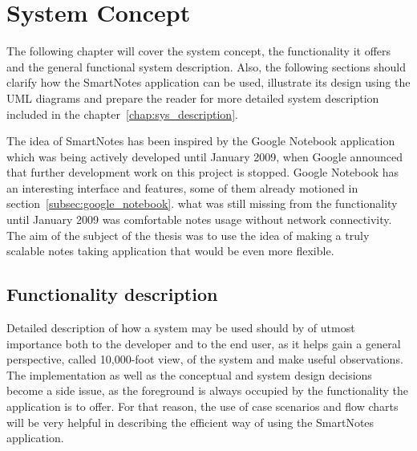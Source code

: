 \chapter{System Concept}\label{chap:concept}
The following chapter will cover the system concept, the functionality it offers and the general functional system description. Also, the following sections should clarify how the SmartNotes application can be used, illustrate its design using the UML diagrams and prepare the reader for more detailed system description included in the chapter~\ref{chap:sys_description}.

The idea of SmartNotes has been inspired by the Google Notebook application which was being actively developed until January 2009, when Google announced that further development work on this project is stopped. Google Notebook has an interesting interface and features, some of them already motioned in section~\ref{subsec:google_notebook}. what was still missing from the functionality until January 2009 was comfortable notes usage without network connectivity. The aim of the subject of the thesis was to use the idea of making a truly scalable notes taking application that would be even more flexible.

\section{Functionality description}\label{sec:functionality_descr} 
Detailed description of how a system may be used should by of utmost importance both to the developer and to the end user, as it helps gain a general perspective, called 10,000-foot view\cite[page 49]{uml_use_case}, of the system and make useful observations. The implementation as well as the conceptual and system design decisions become a side issue, as the foreground is always occupied by the functionality  the application is to offer. For that reason, the use of case scenarios and flow charts will be very helpful in describing the efficient way of using the SmartNotes application.

